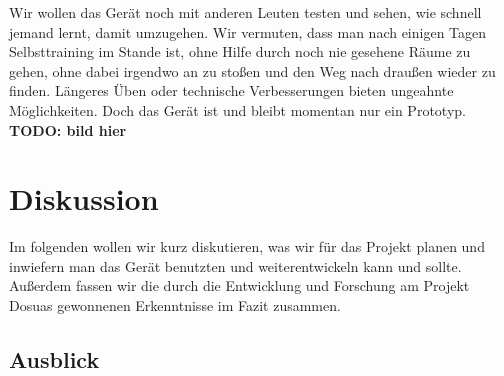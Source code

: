 \documentclass[a4paper,12pt,ngerman]{scrartcl}
\begin{document}
Wir wollen das Gerät noch mit
anderen Leuten testen und sehen, wie schnell jemand lernt, damit umzugehen. Wir vermuten, dass man nach einigen 
Tagen Selbsttraining im Stande ist, ohne Hilfe durch noch nie gesehene Räume zu gehen, ohne dabei irgendwo an zu
stoßen und den Weg nach draußen wieder zu finden. Längeres Üben oder technische Verbesserungen bieten ungeahnte
Möglichkeiten. Doch das Gerät ist und bleibt momentan nur ein Prototyp. \textbf{TODO: bild hier}

\newpage

\section{Diskussion}

Im folgenden wollen wir kurz diskutieren, was wir für das Projekt planen und inwiefern man das
Gerät benutzten und weiterentwickeln kann und sollte. Außerdem fassen wir die durch die Entwicklung und Forschung am Projekt Dosuas gewonnenen Erkenntnisse im Fazit zusammen. 

\subsection{Ausblick}
\end{document}
